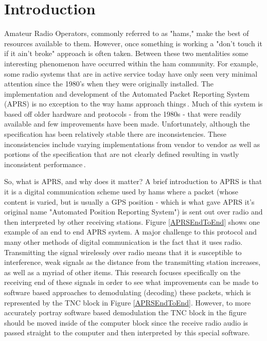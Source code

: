 \chapter{Introduction}

Amateur Radio Operators, commonly referred to as "hams," make the best of resources available to them. However, once something is working a "don't touch it if it ain't broke" approach is often taken. Between these two mentalities some interesting phenomenon have occurred within the ham community. For example, some radio systems that are in active service today have only seen very minimal attention since the 1980's when they were originally installed. The implementation and development of the Automated Packet Reporting System (APRS) is no exception to the way hams approach things\,\cite{Bruninga}. Much of this system is based off older hardware and protocols - from the 1980s - that were readily available and few improvements have been made. Unfortunately, although the specification has been relatively stable there are inconsistencies. These inconsistencies include varying implementations from vendor to vendor as well as portions of the specification that are not clearly defined resulting in vastly inconsistent performance\,\cite{KWFThesis, KWFTAPR}.

So, what is APRS, and why does it matter? A brief introduction to APRS is that it is a digital communication scheme used by hams where a packet (whose content is varied, but is usually a GPS position - which is what gave APRS it's original name "Automated Position Reporting System"\cite{WikiAPRS}) is sent out over radio and then interpreted by other receiving stations. Figure \ref{APRSEndToEnd} shows one example of an end to end APRS system. A major challenge to this protocol and many other methods of digital communication is the fact that it uses radio. Transmitting the signal wirelessly over radio means that it is susceptible to interference, weak signals as the distance from the transmitting station increases, as well as a myriad of other items. This research focuses specifically on the receiving end of these signals in order to see what improvements can be made to software based approaches to demodulating (decoding) these packets, which is represented by the TNC block in Figure \ref{APRSEndToEnd}. However, to more accurately portray software based demodulation the TNC block in the figure should be moved inside of the computer block since the receive radio audio is passed straight to the computer and then interpreted by this special software.

